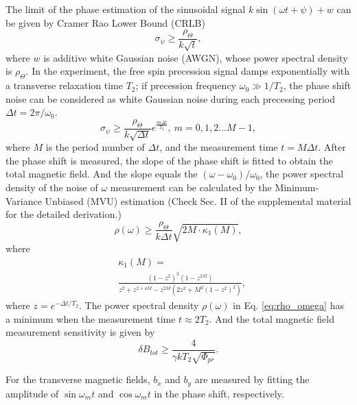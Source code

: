 \documentclass[prx,twocolumn,10pt,nofootinbib]{revtex4-1}
\begin{document}
The limit of the phase estimation of the sinusoidal signal $k \sin(\omega t +\psi) + w$ can be given by Cramer Rao Lower Bound (CRLB) \cite{kay1993fundamentals}
\begin{equation}
	\sigma_\psi \geq \frac{\rho_\Theta}{k \sqrt{t}},
	\label{eq:phase_crlb}
\end{equation}
where $w$ is additive white Gaussian noise (AWGN), whose power spectral density is $\rho_{\Theta}$. In the experiment, the free spin precession signal damps exponentially with a transverse relaxation time $T_2$; if precession frequency $\omega_0 \gg 1/T_2$, the phase shift noise can be considered as white Gaussian noise during each precessing period $\Delta t = 2 \pi/\omega_0$.
\begin{equation}
    \sigma_\psi \geq \frac{\rho_\Theta}{k \sqrt{\Delta t}} e^{\frac{m \Delta t}{T_2}}, ~m = 0,1,2...M-1,
\end{equation}
where $M$ is the period number of $\Delta t$, and the measurement time $t=M \Delta t$. After the phase shift is measured, the slope of the phase shift is fitted to obtain the total magnetic field. And the slope equals the $(\omega- \omega_0)/\omega_0$, the power spectral density of the noise of $\omega$ measurement can be calculated by the Minimum-Variance Unbiased (MVU) estimation (Check Sec. II of the supplemental material for the detailed derivation.)
\begin{equation}
    \rho(\omega) \geq \frac{\rho_{\Theta}}{k \Delta t}\sqrt{2 M \cdot \kappa_1(M)},
    \label{eq:rho_omega}
\end{equation}
where 
\begin{equation}
\begin{aligned}
    & \kappa_1 (M) =\\
    &\frac{(1-z^2)^3(1-z^{2M})}{z^2+z^{2+4M}-z^{2M}(2z^2+M^2(1-z^2)^2)},
 \end{aligned}
\end{equation}
where $z=e^{-\Delta t/T_2}$. The power spectral density $\rho(\omega)$ in Eq. \ref{eq:rho_omega} has a minimum when the measurement time $t \approx 2 T_2$. And the total magnetic field measurement sensitivity is given by 
\begin{equation}
	\delta B_{tot} \geq \frac{4}{\gamma k T_2 \sqrt{\Phi_{pr}}}.
\end{equation}

For the transverse magnetic fields, $b_x$ and $b_y$ are measured by fitting the amplitude of $\sin \omega_m t$ and $\cos \omega_m t$ in the phase shift, respectively.
\end{document}
